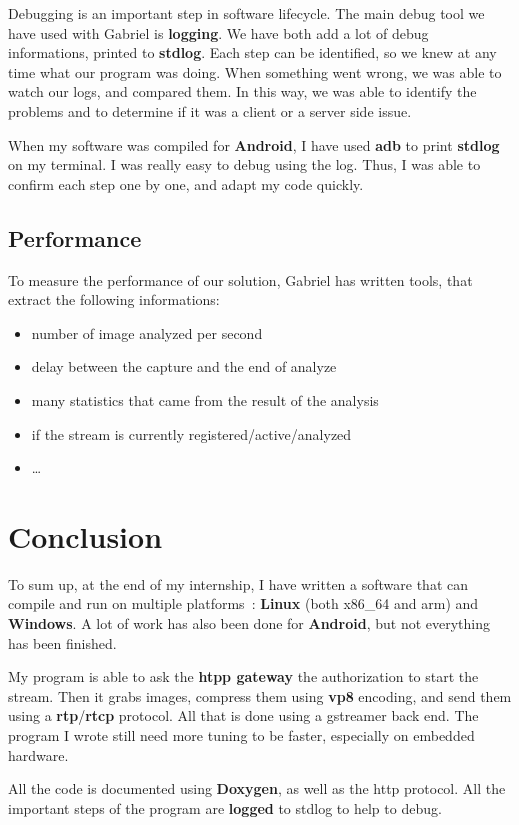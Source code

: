 \documentclass[a4paper,11pt]{custom}
\newcommand{\rtp}{\textbf{rtp}\xspace}
\newcommand{\rtcp}{\textbf{rtcp}\xspace}
\newcommand{\vpx}{\textbf{vp8}\xspace}
\newcommand{\linux}{\textbf{Linux}\xspace}
\newcommand{\win}{\textbf{Windows}\xspace}
\newcommand{\android}{\textbf{Android}\xspace}
\begin{document}
Debugging is an important step in software lifecycle. The main debug tool we have
used with Gabriel is \textbf{logging}. We have both add a lot of debug
informations, printed to \textbf{stdlog}. Each step can be identified, so we knew
at any time what our program was doing. When something went wrong, we was able
to watch our logs, and compared them. In this way, we was able to identify
the problems and to determine if it was a client or a server side issue.

When my software was compiled for \android, I have used \textbf{adb} to print
\textbf{stdlog} on my terminal. I was really easy to debug using the log. Thus,
I was able to confirm each step one by one, and adapt my code quickly.

\subsection{Performance}

To measure the performance of our solution, Gabriel has written tools, that
extract the following informations:
\begin{itemize}
\item number of image analyzed per second
\item delay between the capture and the end of analyze
\item many statistics that came from the result of the analysis
\item if the stream is currently registered/active/analyzed
\item …
\end{itemize}

\section{Conclusion}

To sum up, at the end of my internship, I have written a software that can compile
and run on multiple platforms~: \linux{} (both x86\_64 and arm) and \win. A lot
of work has also been done for \android, but not everything has been finished.

My program is able to ask the \textbf{htpp gateway} the authorization to start the stream.
Then it grabs images, compress them using \vpx{} encoding, and send them using a
\rtp{}/\rtcp{} protocol. All that is done using a gstreamer back end. The program I
wrote still need more tuning to be faster, especially on embedded hardware.

All the code is documented using \textbf{Doxygen}, as well as the http protocol.
All the important steps of the program are \textbf{logged} to stdlog to help
to debug.
\end{document}
